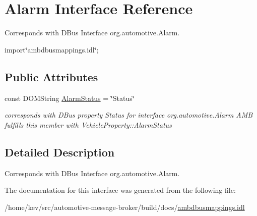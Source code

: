 \hypertarget{interfaceAlarm}{\section{Alarm Interface Reference}
\label{interfaceAlarm}
}


Corresponds with D\+Bus Interface org.\+automotive.\+Alarm.  




{\ttfamily import\char`\"{}ambdbusmappings.\+idl\char`\"{};}

\subsection*{Public Attributes}
\begin{DoxyCompactItemize}
\item 
\hypertarget{interfaceAlarm_a0a8d6354cc6d4a3cbd926268ecce478e}{const D\+O\+M\+String \hyperlink{interfaceAlarm_a0a8d6354cc6d4a3cbd926268ecce478e}{Alarm\+Status} = \char`\"{}Status\char`\"{}}\label{interfaceAlarm_a0a8d6354cc6d4a3cbd926268ecce478e}

\begin{DoxyCompactList}\small\item\em corresponds with D\+Bus property Status for interface org.\+automotive.\+Alarm A\+M\+B fulfills this member with Vehicle\+Property\+::\+Alarm\+Status \end{DoxyCompactList}\end{DoxyCompactItemize}


\subsection{Detailed Description}
Corresponds with D\+Bus Interface org.\+automotive.\+Alarm. 

The documentation for this interface was generated from the following file\+:\begin{DoxyCompactItemize}
\item 
/home/kev/src/automotive-\/message-\/broker/build/docs/\hyperlink{ambdbusmappings_8idl}{ambdbusmappings.\+idl}\end{DoxyCompactItemize}

